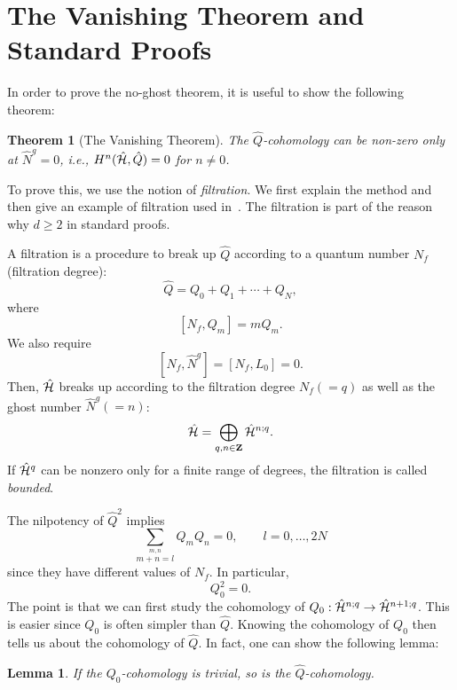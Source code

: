 \documentclass[a4paper,12pt]{article}
\newcommand{\hN}{\hat{N}^g}
\newcommand{\hQ}{\hat{Q}}
\newtheorem{lemma}{Lemma}[section]
\newtheorem{theorem}{Theorem}[section]
\begin{document}
\section{The Vanishing Theorem and Standard Proofs}\label{sec:vanishing}

In order to prove the no-ghost theorem, it is useful to show the following
theorem:
\begin{theorem}[The Vanishing Theorem]
%
The $\hQ$-cohomology can be non-zero only at $ \hN =0 $, {\it i.e.}, 
$H^n(\hat{\cal H}, \hQ)=0$ for $n\neq 0$.
\label{thm:vanishing}
%
\end{theorem}
\noindent To prove this, we use the notion of {\it filtration}.
We first explain the method and then give an example of filtration
used in~\cite{KO,BMP}.
The filtration is part of the reason why $d \geq 2$ in standard proofs.

A filtration is a procedure to break up $\hQ$ according to a quantum number
$ N_{f} $ (filtration degree):
\begin{equation}
%
\hQ = Q_{0}+Q_{1}+\cdots+Q_{N},
%
\end{equation}
where
\begin{equation}
%
[N_{f}, Q_{m}] = m Q_{m}.
%
\end{equation}
We also require
\begin{equation}
%
[N_{f}, \hN] = [N_{f}, L_{0}] = 0.
\label{eq:cond}
%
\end{equation}
Then, $\hat{\cal H}$ breaks up according to the filtration degree $N_f (=q)$ as well as the ghost number $\hN (=n)$:
\begin{equation}
\hat{\cal H} = \bigoplus_{q,n\in {\bf Z}}\hat{\cal H}^{n;q} .
\end{equation}
If $\hat{\cal H}^q$ can be nonzero only for a finite range of degrees, the
filtration is called {\it bounded}.

The nilpotency of $ \hQ^2 $ implies
\begin{equation}
%
\sum_{\stackrel{\scriptstyle m, n}{m+n=l}}
Q_{m}Q_{n} = 0,  \qquad l=0, \ldots ,2N
%
\end{equation}
since they have different values of $ N_{f} $. In particular,
\begin{equation}
%
Q_{0}^2 = 0.
%
\end{equation}
The point is that we can first study the cohomology of
$ Q_{0} : \hat{\cal H}^{n;q}\rightarrow \hat{\cal H}^{n+1;q}$.
This is easier since $ Q_{0} $ is often simpler than $ \hQ$.
Knowing the cohomology of $ Q_{0} $ then tells us about the cohomology of $
\hQ $. In fact, one can show the following lemma:
\begin{lemma}
%
If the $ Q_{0} $-cohomology is trivial,  so is the $ \hQ
$-cohomology.
\label{lemma:exact_sequence}
%
\end{lemma}
\end{document}
